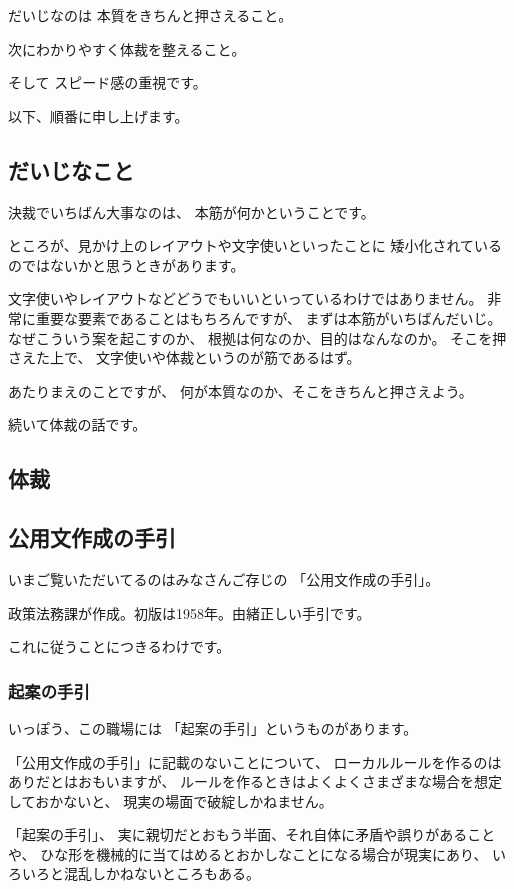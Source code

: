 \documentclass[uplatex,jis2004,dvipdfmx,12pt]{jsarticle}
\begin{document}
だいじなのは
本質をきちんと押さえること。

次にわかりやすく体裁を整えること。

そして
スピード感の重視です。



以下、順番に申し上げます。

\subsection{だいじなこと}
決裁でいちばん大事なのは、
本筋が何かということです。

ところが、見かけ上のレイアウトや文字使いといったことに
矮小化されているのではないかと思うときがあります。

文字使いやレイアウトなどどうでもいいといっているわけではありません。
非常に重要な要素であることはもちろんですが、
まずは本筋がいちばんだいじ。
なぜこういう案を起こすのか、
根拠は何なのか、目的はなんなのか。
そこを押さえた上で、
文字使いや体裁というのが筋であるはず。

あたりまえのことですが、
何が本質なのか、そこをきちんと押さえよう。

続いて体裁の話です。

\subsection{体裁}
\subsection{公用文作成の手引}


いまご覧いただいてるのはみなさんご存じの
「公用文作成の手引」。

政策法務課が作成。初版は1958年。由緒正しい手引です。

これに従うことにつきるわけです。

\subsubsection{起案の手引}
いっぽう、この職場には
「起案の手引」というものがあります。

「公用文作成の手引」に記載のないことについて、
ローカルルールを作るのはありだとはおもいますが、
ルールを作るときはよくよくさまざまな場合を想定しておかないと、
現実の場面で破綻しかねません。

「起案の手引」、
実に親切だとおもう半面、それ自体に矛盾や誤りがあることや、
ひな形を機械的に当てはめるとおかしなことになる場合が現実にあり、
いろいろと混乱しかねないところもある。
\end{document}
